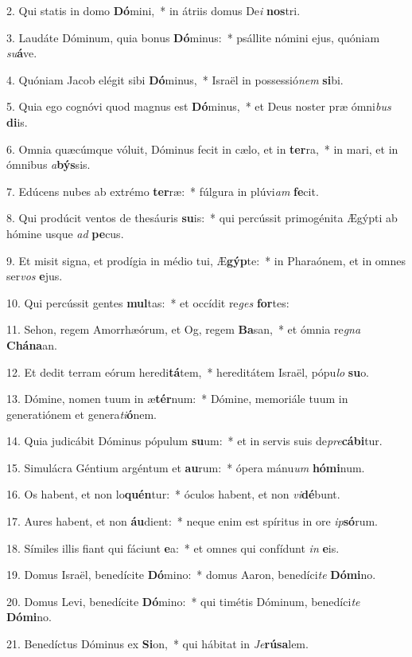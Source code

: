 2. Qui statis in domo \textbf{Dó}mini,~*  in átriis domus De\textit{i} \textbf{nos}tri.\

3. Laudáte Dóminum, quia bonus \textbf{Dó}minus:~*  psállite nómini ejus, quóniam \textit{su}\textbf{á}ve.\

4. Quóniam Jacob elégit sibi \textbf{Dó}minus,~*  Israël in possessió\textit{nem} \textbf{si}bi.\

5. Quia ego cognóvi quod magnus est \textbf{Dó}minus,~*  et Deus noster præ ómni\textit{bus} \textbf{di}is.\

6. Omnia quæcúmque vóluit, Dóminus fecit in cælo, et in \textbf{ter}ra,~*  in mari, et in ómnibus \textit{a}\textbf{býs}sis.\

7. Edúcens nubes ab extrémo \textbf{ter}ræ:~*  fúlgura in plúvi\textit{am} \textbf{fe}cit.\

8. Qui prodúcit ventos de thesáuris \textbf{su}is:~*  qui percússit primogénita Ægýpti ab hómine usque \textit{ad} \textbf{pe}cus.\

9. Et misit signa, et prodígia in médio tui, Æ\textbf{gýp}te:~*  in Pharaónem, et in omnes ser\textit{vos} \textbf{e}jus.\

10. Qui percússit gentes \textbf{mul}tas:~*  et occídit re\textit{ges} \textbf{for}tes:\

11. Sehon, regem Amorrhæórum, et Og, regem \textbf{Ba}san,~*  et ómnia re\textit{gna} \textbf{Chá}\textbf{na}an.\

12. Et dedit terram eórum heredi\textbf{tá}tem,~*  hereditátem Israël, pópu\textit{lo} \textbf{su}o.\

13. Dómine, nomen tuum in æ\textbf{tér}num:~*  Dómine, memoriále tuum in generatiónem et genera\textit{ti}\textbf{ó}nem.\

14. Quia judicábit Dóminus pópulum \textbf{su}um:~*  et in servis suis de\textit{pre}\textbf{cá}\textbf{bi}tur.\

15. Simulácra Géntium argéntum et \textbf{au}rum:~*  ópera mánu\textit{um} \textbf{hó}\textbf{mi}num.\

16. Os habent, et non lo\textbf{quén}tur:~*  óculos habent, et non \textit{vi}\textbf{dé}bunt.\

17. Aures habent, et non \textbf{áu}dient:~*  neque enim est spíritus in ore \textit{ip}\textbf{só}rum.\

18. Símiles illis fiant qui fáciunt \textbf{e}a:~*  et omnes qui confídunt \textit{in} \textbf{e}is.\

19. Domus Israël, benedícite \textbf{Dó}mino:~*  domus Aaron, benedíci\textit{te} \textbf{Dó}\textbf{mi}no.\

20. Domus Levi, benedícite \textbf{Dó}mino:~*  qui timétis Dóminum, benedíci\textit{te} \textbf{Dó}\textbf{mi}no.\

21. Benedíctus Dóminus ex \textbf{Si}on,~*  qui hábitat in \textit{Je}\textbf{rú}\textbf{sa}lem.\

